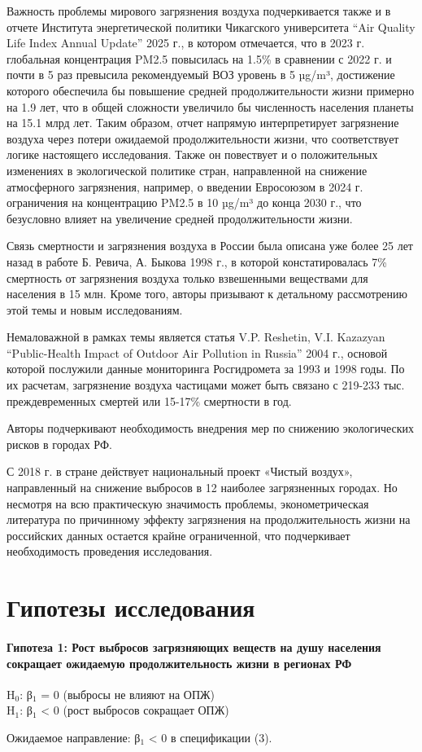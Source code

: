 \documentclass[11pt,a4paper]{article}
\begin{document}
Важность проблемы мирового загрязнения воздуха подчеркивается также и в отчете Института энергетической политики Чикагского университета “Air Quality Life Index Annual Update” 2025 г., в котором отмечается, что в 2023 г. глобальная концентрация PM2.5 повысилась на 1.5\% в сравнении с 2022 г. и почти в 5 раз превысила рекомендуемый ВОЗ уровень в 5 µg/m³, достижение которого обеспечила бы повышение средней продолжительности жизни примерно на 1.9 лет, что в общей сложности увеличило бы численность населения планеты на 15.1 млрд лет. Таким образом, отчет напрямую интерпретирует загрязнение воздуха через потери ожидаемой продолжительности жизни, что соответствует логике настоящего исследования. Также он повествует и о положительных изменениях в экологической политике стран, направленной на снижение атмосферного загрязнения, например, о введении Евросоюзом в 2024 г. ограничения на концентрацию PM2.5 в 10 µg/m³ до конца 2030 г., что безусловно влияет на увеличение средней продолжительности жизни.

Связь смертности и загрязнения воздуха в России была описана уже более 25 лет назад в работе Б. Ревича, А. Быкова 1998 г., в которой констатировалась 7\% смертность от загрязнения воздуха только взвешенными веществами для населения в 15 млн. Кроме того, авторы призывают к детальному рассмотрению этой темы и новым исследованиям.

Немаловажной в рамках темы является статья V.P. Reshetin, V.I. Kazazyan “Public-Health Impact of Outdoor Air Pollution in Russia” 2004 г., основой которой послужили данные мониторинга Росгидромета за 1993 и 1998 годы. По их расчетам, загрязнение воздуха частицами может быть связано с 219-233 тыс. преждевременных смертей или 15-17\% смертности в год.

Авторы подчеркивают необходимость внедрения мер по снижению экологических рисков в городах РФ.

С 2018 г. в стране действует национальный проект «Чистый воздух», направленный на снижение выбросов в 12 наиболее загрязненных городах. Но несмотря на всю практическую значимость проблемы, эконометрическая литература по причинному эффекту загрязнения на продолжительность жизни на российских данных остается крайне ограниченной, что подчеркивает необходимость проведения исследования.

\section*{Гипотезы исследования}
\paragraph{Гипотеза 1: Рост выбросов загрязняющих веществ на душу населения сокращает ожидаемую продолжительность жизни в регионах РФ}
\begin{center}\small H$_0$: β$_1$ = 0 (выбросы не влияют на ОПЖ) \\ H$_1$: β$_1$ < 0 (рост выбросов сокращает ОПЖ)\end{center}
Ожидаемое направление: β$_1$ < 0 в спецификации (3).
\end{document}
